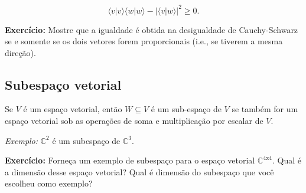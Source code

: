 \documentclass[11pt]{article}
\begin{document}
\begin{equation}
\langle v|v\rangle\langle w|w\rangle - |\langle v|w\rangle|^{2} \ge 0.
\end{equation}

\textbf{Exercício:} Mostre que a igualdade é obtida na desigualdade de
Cauchy-Schwarz se e somente se os dois vetores forem proporcionais
(i.e., se tiverem a mesma direção).

    \subsection{Subespaço vetorial}\label{subespauxe7o-vetorial}

Se \(V\) é um espaço vetorial, então \(W\subseteq V\) é um sub-espaço de
\(V\) se também for um espaço vetorial sob as operações de soma e
multiplicação por escalar de \(V\).

\emph{Exemplo:} \(\mathbb{C}^{2}\) é um subespaço de \(\mathbb{C}^{3}\).

\textbf{Exercício:} Forneça um exemplo de subespaço para o espaço
vetorial \(\mathbb{C}^{4\text{x}4}\). Qual é a dimensão desse espaço
vetorial? Qual é dimensão do subespaço que você escolheu como exemplo?


    
    
    
    
\end{document}
